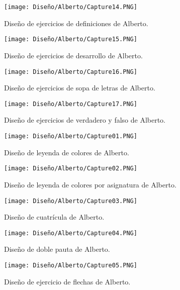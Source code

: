 \begin{figure}[ht!]
  \centering
  \texttt{[image: Diseño/Alberto/Capture14.PNG]}
  \caption{Diseño de ejercicios de definiciones de Alberto.}
  \label{Alberto14}
\end{figure}

\begin{figure}[ht!]
  \centering
  \texttt{[image: Diseño/Alberto/Capture15.PNG]}
  \caption{Diseño de ejercicios de desarrollo de Alberto.}
  \label{Alberto15}
\end{figure}

\begin{figure}[ht!]
  \centering
  \texttt{[image: Diseño/Alberto/Capture16.PNG]}
  \caption{Diseño de ejercicios de sopa de letras de Alberto.}
  \label{Alberto16}
\end{figure}

\begin{figure}[ht!]
  \centering
  \texttt{[image: Diseño/Alberto/Capture17.PNG]}
  \caption{Diseño de ejercicios de verdadero y falso de Alberto.}
  \label{Alberto17}
\end{figure}


\begin{figure}[ht!]
  \centering
  \texttt{[image: Diseño/Alberto/Capture01.PNG]}
  \caption{Diseño de leyenda de colores de Alberto.}
  \label{Alberto1}
\end{figure}

\begin{figure}[ht!]
  \centering
  \texttt{[image: Diseño/Alberto/Capture02.PNG]}
  \caption{Diseño de leyenda de colores por asignatura de Alberto.}
  \label{Alberto2}
\end{figure}

\begin{figure}[ht!]
  \centering
  \texttt{[image: Diseño/Alberto/Capture03.PNG]}
  \caption{Diseño de cuatrícula de Alberto.}
  \label{Alberto3}
\end{figure}

\begin{figure}[ht!]
  \centering
  \texttt{[image: Diseño/Alberto/Capture04.PNG]}
  \caption{Diseño de doble pauta de Alberto.}
  \label{Alberto4}
\end{figure}

\begin{figure}[ht!]
  \centering
  \texttt{[image: Diseño/Alberto/Capture05.PNG]}
  \caption{Diseño de ejercicio de flechas de Alberto.}
  \label{Alberto5}
\end{figure}

